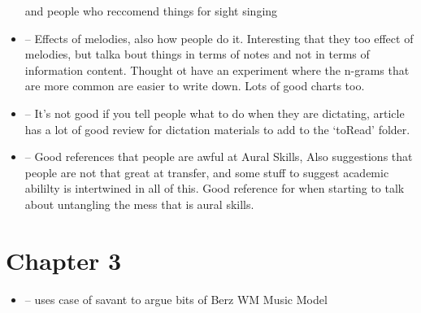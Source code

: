 \documentclass[]{book}
\providecommand{\tightlist}{%
  \setlength{\itemsep}{0pt}\setlength{\parskip}{0pt}}
\theoremstyle{definition}
\theoremstyle{definition}
\theoremstyle{definition}
\theoremstyle{remark}
\begin{document}
\begin{itemize}
  and people who reccomend things for sight singing
\item
  \citep{pembrookInterferenceTranscriptionProcess1986} -- Effects of
  melodies, also how people do it. Interesting that they too effect of
  melodies, but talka bout things in terms of notes and not in terms of
  information content. Thought ot have an experiment where the n-grams
  that are more common are easier to write down. Lots of good charts
  too.
\item
  \citep{paneyEffectDirectingAttention2016} -- It's not good if you tell
  people what to do when they are dictating, article has a lot of good
  review for dictation materials to add to the `toRead' folder.
\item
  \citep{fournierCognitiveStrategiesSightsinging2017a} -- Good
  references that people are awful at Aural Skills, Also suggestions
  that people are not that great at transfer, and some stuff to suggest
  academic abililty is intertwined in all of this. Good reference for
  when starting to talk about untangling the mess that is aural skills.
\end{itemize}

\hypertarget{chapter-3}{%
\section{Chapter 3}\label{chapter-3}}

\begin{itemize}
\tightlist
\item
  \citep{ockelfordMusicModuleWorking2007} -- uses case of savant to
  argue bits of Berz WM Music Model
\end{itemize}


\end{document}
